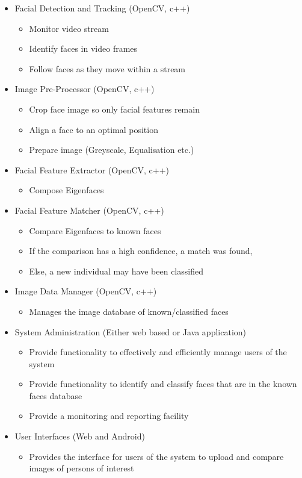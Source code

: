 \documentclass[a4paper]{article}
\begin{document}
				\begin{itemize}
				
					\item Facial Detection and Tracking (OpenCV, c++)
						\begin{itemize}
							\item Monitor video stream
							\item Identify faces in video frames
							\item Follow faces as they move within a stream
						\end{itemize}
					\item Image Pre-Processor (OpenCV, c++)
						\begin{itemize}
							\item Crop face image so only facial features remain
							\item Align a face to an optimal position
							\item Prepare image (Greyscale, Equalisation etc.)
						\end{itemize}
					\item Facial Feature Extractor (OpenCV, c++)
						\begin{itemize}
							\item Compose Eigenfaces
						\end{itemize}
					\item Facial Feature Matcher (OpenCV, c++)
						\begin{itemize}
							\item Compare Eigenfaces to known faces
							\item If the comparison has a high confidence, a match was found,
							\item Else, a new individual may have been classified
						\end{itemize}
					\item Image Data Manager (OpenCV, c++)
						\begin{itemize}
							\item Manages the image database of known/classified faces
						\end{itemize}
					\item System Administration (Either web based or Java application)
						\begin{itemize}
							\item Provide functionality to effectively and efficiently manage users of the system
							\item Provide functionality to identify and classify faces that are in the known faces database
							\item Provide a monitoring and reporting facility
						\end{itemize}
					\item User Interfaces (Web and Android)
						\begin{itemize}
							\item Provides the interface for users of the system to upload and compare images of persons of interest
						\end{itemize}
					
				\end{itemize}
			
\end{document}
